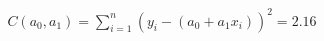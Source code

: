 \documentclass[preview]{standalone}
\begin{document}
\begin{align*}
C(a_0, a_1) = \sum_{i=1}^{n} (y_i - (a_0 + a_1x_i))^2 =2.16
\end{align*}
\end{document}
